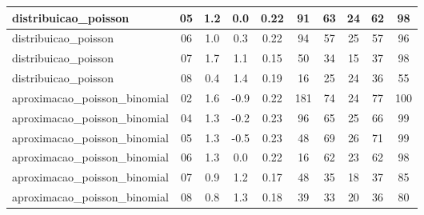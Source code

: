 \documentclass[a4paper]{report}
\begin{document}
\begin{longtable}{l|c|c|c|c|c|c|c|c|c}
\hline
distribuicao\_poisson & 05 & 1.2 & 0.0 & 0.22 & 91 & 63 & 24 & 62 & 98\\
\hline
distribuicao\_poisson & 06 & 1.0 & 0.3 & 0.22 & 94 & 57 & 25 & 57 & 96\\
\hline
distribuicao\_poisson & 07 & 1.7 & 1.1 & 0.15 & 50 & 34 & 15 & 37 & 98\\
\hline
distribuicao\_poisson & 08 & 0.4 & 1.4 & 0.19 & 16 & 25 & 24 & 36 & 55\\
\hline
aproximacao\_poisson\_binomial & 02 & 1.6 & -0.9 & 0.22 & 181 & 74 & 24 & 77 & 100\\
\hline
aproximacao\_poisson\_binomial & 04 & 1.3 & -0.2 & 0.23 & 96 & 65 & 25 & 66 & 99\\
\hline
aproximacao\_poisson\_binomial & 05 & 1.3 & -0.5 & 0.23 & 48 & 69 & 26 & 71 & 99\\
\hline
aproximacao\_poisson\_binomial & 06 & 1.3 & 0.0 & 0.22 & 16 & 62 & 23 & 62 & 98\\
\hline
aproximacao\_poisson\_binomial & 07 & 0.9 & 1.2 & 0.17 & 48 & 35 & 18 & 37 & 85\\
\hline
aproximacao\_poisson\_binomial & 08 & 0.8 & 1.3 & 0.18 & 39 & 33 & 20 & 36 & 80\\
\hline
\end{longtable}
\end{document}
